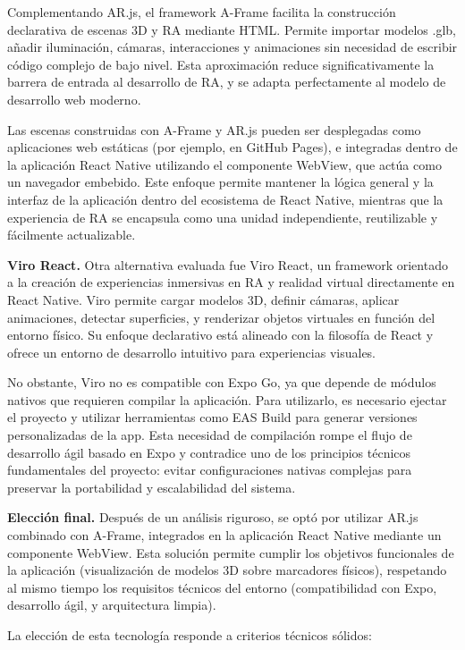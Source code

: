 Complementando AR.js, el framework A-Frame facilita la construcción declarativa de escenas 3D y RA mediante HTML. Permite importar modelos .glb, añadir iluminación, cámaras, interacciones y animaciones sin necesidad de escribir código complejo de bajo nivel. Esta aproximación reduce significativamente la barrera de entrada al desarrollo de RA, y se adapta perfectamente al modelo de desarrollo web moderno.

Las escenas construidas con A-Frame y AR.js pueden ser desplegadas como aplicaciones web estáticas (por ejemplo, en GitHub Pages), e integradas dentro de la aplicación React Native utilizando el componente WebView, que actúa como un navegador embebido. Este enfoque permite mantener la lógica general y la interfaz de la aplicación dentro del ecosistema de React Native, mientras que la experiencia de RA se encapsula como una unidad independiente, reutilizable y fácilmente actualizable.

\textbf{Viro React.}
Otra alternativa evaluada fue Viro React, un framework orientado a la creación de experiencias inmersivas en RA y realidad virtual directamente en React Native. Viro permite cargar modelos 3D, definir cámaras, aplicar animaciones, detectar superficies, y renderizar objetos virtuales en función del entorno físico. Su enfoque declarativo está alineado con la filosofía de React y ofrece un entorno de desarrollo intuitivo para experiencias visuales.

No obstante, Viro no es compatible con Expo Go, ya que depende de módulos nativos que requieren compilar la aplicación. Para utilizarlo, es necesario ejectar el proyecto y utilizar herramientas como EAS Build para generar versiones personalizadas de la app. Esta necesidad de compilación rompe el flujo de desarrollo ágil basado en Expo y contradice uno de los principios técnicos fundamentales del proyecto: evitar configuraciones nativas complejas para preservar la portabilidad y escalabilidad del sistema.

\textbf{Elección final.}
Después de un análisis riguroso, se optó por utilizar AR.js combinado con A-Frame, integrados en la aplicación React Native mediante un componente WebView. Esta solución permite cumplir los objetivos funcionales de la aplicación (visualización de modelos 3D sobre marcadores físicos), respetando al mismo tiempo los requisitos técnicos del entorno (compatibilidad con Expo, desarrollo ágil, y arquitectura limpia).

La elección de esta tecnología responde a criterios técnicos sólidos:

